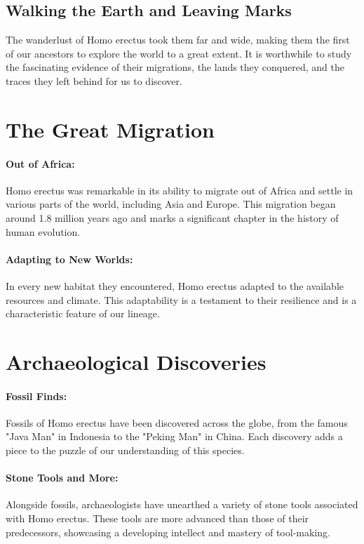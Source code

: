 \documentclass{book}
\begin{document}
\subsection*{Walking the Earth and Leaving Marks}
The wanderlust of Homo erectus took them far and wide, making them the first of our ancestors to explore the world to a great extent. It is worthwhile to study the fascinating evidence of their migrations, the lands they conquered, and the traces they left behind for us to discover.

\section*{The Great Migration}

\paragraph{Out of Africa:}
Homo erectus was remarkable in its ability to migrate out of Africa and settle in various parts of the world, including Asia and Europe. This migration began around 1.8 million years ago and marks a significant chapter in the history of human evolution.

\paragraph{Adapting to New Worlds:}
In every new habitat they encountered, Homo erectus adapted to the available resources and climate. This adaptability is a testament to their resilience and is a characteristic feature of our lineage.

\section*{Archaeological Discoveries}

\paragraph{Fossil Finds:}
Fossils of Homo erectus have been discovered across the globe, from the famous "Java Man" in Indonesia to the "Peking Man" in China. Each discovery adds a piece to the puzzle of our understanding of this species.

\paragraph{Stone Tools and More:}
Alongside fossils, archaeologists have unearthed a variety of stone tools associated with Homo erectus. These tools are more advanced than those of their predecessors, showcasing a developing intellect and mastery of tool-making.
\end{document}
